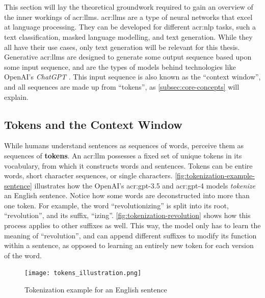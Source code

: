 \section[Large Language Models]{}
\label{sec:llms}

This section will lay the theoretical groundwork required to gain an overview of the inner workings of \glspl{acr:llm}. \glspl{acr:llm} are a type of neural networks that excel at language processing. They can be developed for different \gls{acr:nlp} tasks, such a text classification, masked language modelling, and text generation. While they all have their use cases, only text generation will be relevant for this thesis. Generative \glspl{acr:llm} are designed to generate some output sequence based upon some input sequence, and are the types of models behind technologies like OpenAI's \textit{ChatGPT} \citep{openaiIntroducingChatGPT2022}. This input sequence is also known as the \enquote{context window}, and all sequences are made up from \enquote{tokens}, as \autoref{subsec:core-concepts} will explain.


\subsection{Tokens and the Context Window}
\label{subsec:core-concepts}

While humans understand sentences as sequences of words,  perceive them as sequences of \textbf{tokens}. An \acrshort{acr:llm} possesses a fixed set of unique tokens in its vocabulary, from which it constructs words and sentences. Tokens can be entire words, short character sequences, or single characters. \autoref{fig:tokenization-example-sentence} illustrates how the OpenAI's \acrshort{acr:gpt}-3.5 and \acrshort{acr:gpt}-4 models \textit{tokenize} an English sentence. Notice how some words are deconstructed into more than one token. For example, the word \enquote{revolutionizing} is split into its root, \enquote{revolution}, and its suffix, \enquote{izing}. \autoref{fig:tokenization-revolution} shows how this process applies to other suffixes as well. This way, the model only has to learn the meaning of \enquote{revolution}, and can append different suffixes to modify its function within a sentence, as opposed to learning an entirely new token for each version of the word.

\begin{figure}[htp]
    \centering
    \texttt{[image: tokens\_illustration.png]}
    \caption{Tokenization example for an English sentence}
    \label{fig:tokenization-example-sentence}
\end{figure}

